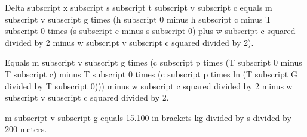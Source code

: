 Delta subscript x subscript s subscript t subscript v subscript c equals m subscript v subscript g times (h subscript 0 minus h subscript c minus T subscript 0 times (s subscript c minus s subscript 0) plus w subscript c squared divided by 2 minus w subscript v subscript c squared divided by 2).

Equals m subscript v subscript g times (c subscript p times (T subscript 0 minus T subscript c) minus T subscript 0 times (c subscript p times ln (T subscript G divided by T subscript 0))) minus w subscript c squared divided by 2 minus w subscript v subscript c squared divided by 2.

m subscript v subscript g equals 15.100 in brackets kg divided by s divided by 200 meters.